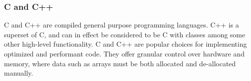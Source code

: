 \subsubsection{C and C++} \label{background:implementation_tools_and_libraries:c_and_cpp}
C and C++ are compiled general purpose programming languages.
C++ is a superset of C, and can in effect be considered to be C with classes among some other high-level functionality.
C and C++ are popular choices for implementing optimized and performant code.
They offer granular control over hardware and memory, where data such as arrays must be both allocated and de-allocated manually.
